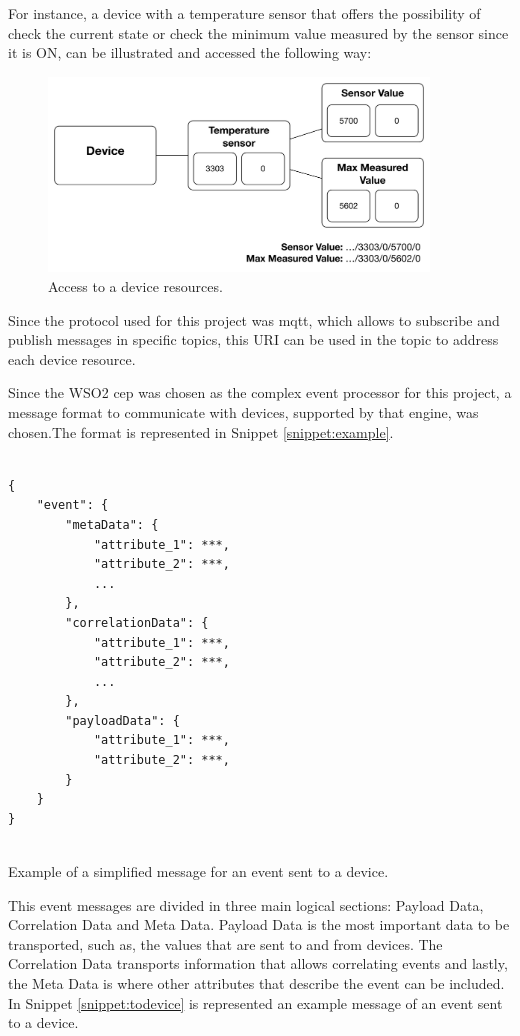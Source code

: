For instance, a device with a temperature sensor that offers the possibility of check the current state or check the minimum value measured by the sensor since it is ON, can be illustrated and accessed the following way:


\begin{figure}[H]
	\centering
	\includegraphics[width=0.9\textwidth]{figures/obj2.png}
	\caption{Access to a device resources.}
	\label{fig:obj2}
\end{figure}
	
Since the protocol used for this project was \ac{mqtt}, which allows to subscribe and publish messages in specific topics, this URI can be used in the topic to address each device resource. 


Since the WSO2 \ac{cep} was chosen as the complex event processor for this project\cite{helder}, a message format to communicate with devices, supported by that engine, was chosen.The format is represented in Snippet \ref{snippet:example}.

\begin{listing}[H]
\begin{verbatim}

{
    "event": {
        "metaData": { 
            "attribute_1": ***,
            "attribute_2": ***,
            ...
        },
        "correlationData": {
            "attribute_1": ***,
            "attribute_2": ***,
            ...
        }, 
        "payloadData": {
            "attribute_1": ***, 
            "attribute_2": ***,
        }
    }
}


\end{verbatim}
\caption{Example of a simplified message for an event sent to a device.}
\label{snippet:example}
\end{listing}

This event messages are divided in three main logical sections: Payload Data, Correlation Data and Meta Data. Payload Data is the most important data to be transported, such as, the values that are sent to and from devices. The Correlation Data transports information that allows correlating events and lastly, the Meta Data is where other attributes that describe the event can be included. In Snippet \ref{snippet:todevice} is represented an example message of an event sent to a device.

